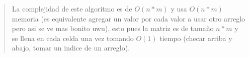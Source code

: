 \begin{quote}
    La complejidad de este algoritmo es de $O(n*m)$ y usa $O(n*m)$ memoria (es equivalente agregar un valor por cada valor a usar otro arreglo pero asi se ve mas bonito uwu), esto pues la matriz es de tamaño $n*m$ y se llena en cada celda una vez tomando $O(1)$ tiempo (checar arriba y abajo, tomar un indice de un arreglo). \vspace{.2cm}
\end{quote}